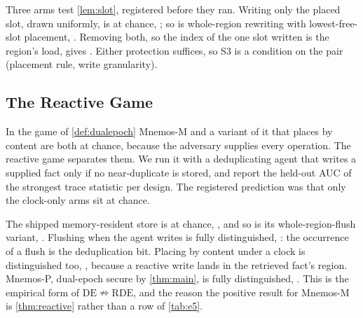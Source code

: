 Three arms test \cref{lem:slot}, registered before they ran. Writing only the placed slot, drawn
uniformly, is at chance, \REfiveSlotRandom; so is whole-region rewriting with lowest-free-slot
placement, \REfiveRegionFirstFree. Removing both, so the index of the one slot written is the
region's load, gives \REfiveSlotFirstFree. Either protection suffices, so S3 is a condition on the
pair (placement rule, write granularity).

\subsection{The Reactive Game}
\label{sec:eval-reactive}

In the game of \cref{def:dualepoch} Mnemos-M and a variant of it that places by content are both at
chance, because the adversary supplies every operation. The reactive game separates them. We run it
with a deduplicating agent that writes a supplied fact only if no near-duplicate is stored, and
report the held-out AUC of the strongest trace statistic per design. The registered prediction was
that only the clock-only arms sit at chance.

The shipped memory-resident store is at chance, \REtwentyMSweep, and so is its whole-region-flush
variant, \REtwentyMRegions. Flushing when the agent writes is fully distinguished,
\REtwentyMOnDemand: the occurrence of a flush is the deduplication bit. Placing by content under a
clock is distinguished too, \REtwentyMContent, because a reactive write lands in the retrieved
fact's region. Mnemos-P, dual-epoch secure by \cref{thm:main}, is fully distinguished,
\REtwentyPShipped. This is the empirical form of $\mathrm{DE}\nRightarrow\mathrm{RDE}$, and the
reason the positive result for Mnemos-M is \cref{thm:reactive} rather than a row of \cref{tab:e5}.

